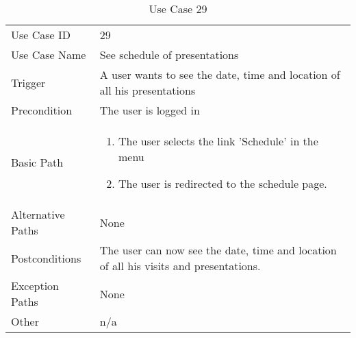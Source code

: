 \begin{table}[H]
\centering
\label{table-use-case-29}
\begin{tabular}{|p{3cm}|p{10cm}}
Use Case ID       & 29                                                         \\
Use Case Name     & See schedule of presentations                                       \\
Trigger           & A user wants to see the date, time and location of all his
presentations \\
Precondition      & The user is logged in               \\
Basic Path        & \begin{enumerate}
\item The user selects the link 'Schedule' in the menu 
\item The user is redirected to the schedule page. 
\end{enumerate} 
     \\
Alternative Paths & None                          \\
Postconditions    & The user can now see the date, time and location of all his visits and
presentations. 		\\
Exception Paths   & None			\\
Other             & n/a                                                                                                                                                                                                        
\end{tabular}
\caption{Use Case 29}
\end{table}

